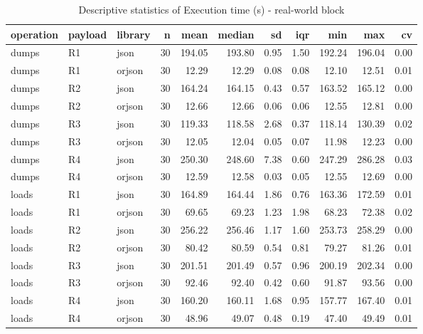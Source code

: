 \begin{table}[ht]
\centering
\begin{tabular}{lllrrrrrrrr}
  \toprule
operation & payload & library & n & mean & median & sd & iqr & min & max & cv \\ 
  \midrule
dumps & R1 & json &  30 & 194.05 & 193.80 & 0.95 & 1.50 & 192.24 & 196.04 & 0.00 \\ 
  dumps & R1 & orjson &  30 & 12.29 & 12.29 & 0.08 & 0.08 & 12.10 & 12.51 & 0.01 \\ 
  dumps & R2 & json &  30 & 164.24 & 164.15 & 0.43 & 0.57 & 163.52 & 165.12 & 0.00 \\ 
  dumps & R2 & orjson &  30 & 12.66 & 12.66 & 0.06 & 0.06 & 12.55 & 12.81 & 0.00 \\ 
  dumps & R3 & json &  30 & 119.33 & 118.58 & 2.68 & 0.37 & 118.14 & 130.39 & 0.02 \\ 
  dumps & R3 & orjson &  30 & 12.05 & 12.04 & 0.05 & 0.07 & 11.98 & 12.23 & 0.00 \\ 
  dumps & R4 & json &  30 & 250.30 & 248.60 & 7.38 & 0.60 & 247.29 & 286.28 & 0.03 \\ 
  dumps & R4 & orjson &  30 & 12.59 & 12.58 & 0.03 & 0.05 & 12.55 & 12.69 & 0.00 \\ 
  loads & R1 & json &  30 & 164.89 & 164.44 & 1.86 & 0.76 & 163.36 & 172.59 & 0.01 \\ 
  loads & R1 & orjson &  30 & 69.65 & 69.23 & 1.23 & 1.98 & 68.23 & 72.38 & 0.02 \\ 
  loads & R2 & json &  30 & 256.22 & 256.46 & 1.17 & 1.60 & 253.73 & 258.29 & 0.00 \\ 
  loads & R2 & orjson &  30 & 80.42 & 80.59 & 0.54 & 0.81 & 79.27 & 81.26 & 0.01 \\ 
  loads & R3 & json &  30 & 201.51 & 201.49 & 0.57 & 0.96 & 200.19 & 202.34 & 0.00 \\ 
  loads & R3 & orjson &  30 & 92.46 & 92.40 & 0.42 & 0.60 & 91.87 & 93.56 & 0.00 \\ 
  loads & R4 & json &  30 & 160.20 & 160.11 & 1.68 & 0.95 & 157.77 & 167.40 & 0.01 \\ 
  loads & R4 & orjson &  30 & 48.96 & 49.07 & 0.48 & 0.19 & 47.40 & 49.49 & 0.01 \\ 
   \bottomrule
\end{tabular}
\caption{Descriptive statistics of Execution time (s) - real-world block} 
\label{tab:rw_desc_T}
\end{table}
